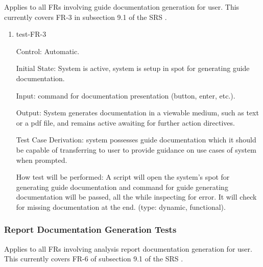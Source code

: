 \documentclass[12pt, titlepage]{article}
\begin{document}
Applies to all FRs involving guide documentation generation for user. This 
currently covers FR-3 in subsection 9.1 of the SRS \citep{SRS}.

\begin{enumerate}

\item{test-FR-3\\}

Control: Automatic.
					
Initial State: System is active, system is setup in spot for generating guide 
documentation.
					
Input: command for documentation presentation (button, enter, etc.).
					
Output: System generates documentation in a viewable medium, such as text or a 
pdf file, and remains active awaiting for further action 
directives.

Test Case Derivation: system possesses guide documentation which it should be 
capable of transferring to user to provide guidance on use cases of system 
when prompted.

How test will be performed: A script will open the system's spot for generating 
guide documentation and command for guide generating documentation will be 
passed, all the while inspecting for error. It will check for missing 
documentation at the end. (type: dynamic, functional).				

\end{enumerate}

\subsubsection{Report Documentation Generation Tests}

Applies to all FRs involving analysis report documentation generation for 
user. This currently covers FR-6 of subsection 9.1 of the SRS \citep{SRS}.
\end{document}
